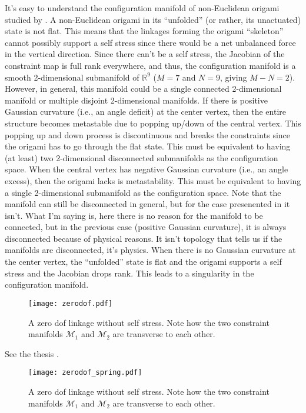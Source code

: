 It's easy to understand the configuration manifold of non-Euclidean origami studied by \cite{berry2020}.
A non-Euclidean origami in its ``unfolded'' (or rather, its unactuated) state is not flat.
This means that the linkages forming the origami ``skeleton'' cannot possibly support a self stress since there would be a net unbalanced force in the vertical direction.
Since there can't be a self stress, the Jacobian of the constraint map is full rank everywhere, and thus, the configuration manifold is a smooth 2-dimensional submanifold of $\mathbb{R}^9$ ($M = 7$ and $N = 9$, giving $M - N = 2$).
However, in general, this manifold could be a single connected 2-dimensional manifold or multiple disjoint 2-dimensional manifolds.
If there is positive Gaussian curvature (i.e., an angle deficit) at the center vertex, then the entire structure becomes metastable due to popping up/down of the central vertex.
This popping up and down process is discontinuous and breaks the constraints since the origami has to go through the flat state.
This must be equivalent to having (at least) two 2-dimensional disconnected submanifolds as the configuration space.
When the central vertex has negative Gaussian curvature (i.e., an angle excess), then the origami lacks is metastability.
This must be equivalent to having a single 2-dimensional submanifold as the configuration space.
Note that the manifold can still be disconnected in general, but for the case presenented in \cite{berry2020} it isn't.
What I'm saying is, here there is no reason for the manifold to be connected, but in the previous case (positive Gaussian curvature), it is always disconnected because of physical reasons.
It isn't topology that tells us if the manifolds are disconnected, it's physics.
When there is no Gaussian curvature at the center vertex, the ``unfolded'' state is flat and the origami supports a self stress and the Jacobian drops rank.
This leads to a singularity in the configuration manifold.

\begin{figure}
  \begin{center}
    \texttt{[image: zerodof.pdf]}
  \end{center}
\caption{A zero \ac{dof} linkage without self stress.  Note how the two constraint manifolds $\mathcal{M}_1$ and $\mathcal{M}_2$ are transverse to each other.}
  \label{fig:hello}
\end{figure}

See the thesis \cite{lengyel2002}.

\begin{figure}
  \begin{center}
    \texttt{[image: zerodof\_spring.pdf]}
  \end{center}
\caption[foo]{A zero \ac{dof} linkage without self stress.  Note how the two constraint manifolds $\mathcal{M}_1$ and $\mathcal{M}_2$ are transverse to each other.}
  \label{fig:hello2}
\end{figure}
\pagebreak

